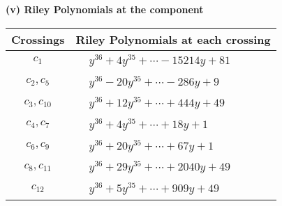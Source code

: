 \documentclass[1p]{elsarticle_modified}
\theoremstyle{definition}
\begin{document}
\newpage\renewcommand{\arraystretch}{1}
\flushleft \textbf{(v) Riley Polynomials at the component}\newline \\
\begin{tabular}{m{50pt}|m{274pt}}
Crossings & \hspace{64pt}Riley Polynomials at each crossing \\
\hline $$\begin{aligned}c_{1}\end{aligned}$$&$\begin{aligned}
&y^{36}+4 y^{35}+\cdots-15214 y+81
\end{aligned}$\\
\hline $$\begin{aligned}c_{2},c_{5}\end{aligned}$$&$\begin{aligned}
&y^{36}-20 y^{35}+\cdots-286 y+9
\end{aligned}$\\
\hline $$\begin{aligned}c_{3},c_{10}\end{aligned}$$&$\begin{aligned}
&y^{36}+12 y^{35}+\cdots+444 y+49
\end{aligned}$\\
\hline $$\begin{aligned}c_{4},c_{7}\end{aligned}$$&$\begin{aligned}
&y^{36}+4 y^{35}+\cdots+18 y+1
\end{aligned}$\\
\hline $$\begin{aligned}c_{6},c_{9}\end{aligned}$$&$\begin{aligned}
&y^{36}+20 y^{35}+\cdots+67 y+1
\end{aligned}$\\
\hline $$\begin{aligned}c_{8},c_{11}\end{aligned}$$&$\begin{aligned}
&y^{36}+29 y^{35}+\cdots+2040 y+49
\end{aligned}$\\
\hline $$\begin{aligned}c_{12}\end{aligned}$$&$\begin{aligned}
&y^{36}+5 y^{35}+\cdots+909 y+49
\end{aligned}$\\
\hline
\end{tabular}\\~\\
\end{document}
